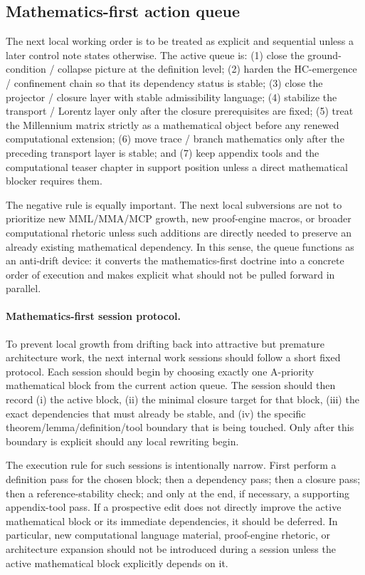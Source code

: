 \documentclass[12pt,a4paper]{article}
\begin{document}
\subsection*{Mathematics-first action queue}
The next local working order is to be treated as explicit and sequential unless a later control note states otherwise. The active queue is: (1) close the ground-condition / collapse picture at the definition level; (2) harden the HC-emergence / confinement chain so that its dependency status is stable; (3) close the projector / closure layer with stable admissibility language; (4) stabilize the transport / Lorentz layer only after the closure prerequisites are fixed; (5) treat the Millennium matrix strictly as a mathematical object before any renewed computational extension; (6) move trace / branch mathematics only after the preceding transport layer is stable; and (7) keep appendix tools and the computational teaser chapter in support position unless a direct mathematical blocker requires them.

The negative rule is equally important. The next local subversions are not to prioritize new MML/MMA/MCP growth, new proof-engine macros, or broader computational rhetoric unless such additions are directly needed to preserve an already existing mathematical dependency. In this sense, the queue functions as an anti-drift device: it converts the mathematics-first doctrine into a concrete order of execution and makes explicit what should not be pulled forward in parallel.


\paragraph{Mathematics-first session protocol.}
To prevent local growth from drifting back into attractive but premature architecture work, the next internal work sessions should follow a short fixed protocol. Each session should begin by choosing exactly one A-priority mathematical block from the current action queue. The session should then record (i) the active block, (ii) the minimal closure target for that block, (iii) the exact dependencies that must already be stable, and (iv) the specific theorem/lemma/definition/tool boundary that is being touched. Only after this boundary is explicit should any local rewriting begin.

The execution rule for such sessions is intentionally narrow. First perform a definition pass for the chosen block; then a dependency pass; then a closure pass; then a reference-stability check; and only at the end, if necessary, a supporting appendix-tool pass. If a prospective edit does not directly improve the active mathematical block or its immediate dependencies, it should be deferred. In particular, new computational language material, proof-engine rhetoric, or architecture expansion should not be introduced during a session unless the active mathematical block explicitly depends on it.
\end{document}
